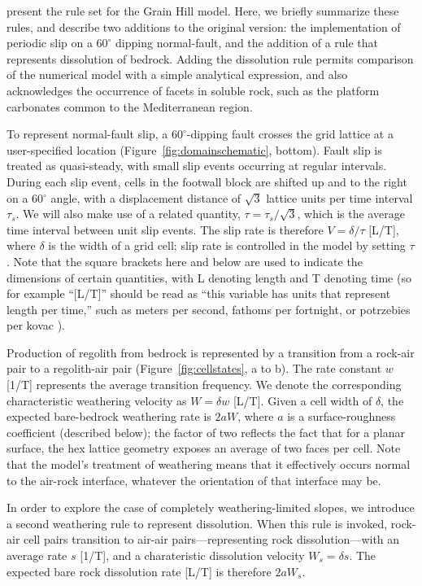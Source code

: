 \citet{tucker2018lattice} present the rule set for the Grain Hill model. Here, we briefly summarize these rules, and describe two additions to the original version: the implementation of periodic slip on a $60^\circ$ dipping normal-fault, and the addition of a rule that represents dissolution of bedrock. Adding the dissolution rule permits comparison of the numerical model with a simple analytical expression, and also acknowledges the occurrence of facets in soluble rock, such as the platform carbonates common to the Mediterranean region.

To represent normal-fault slip, a $60^\circ$-dipping fault crosses the grid lattice at a user-specified location (Figure~\ref{fig:domainschematic}, bottom). Fault slip is treated as quasi-steady, with small slip events occurring at regular intervals. During each slip event, cells in the footwall block are shifted up and to the right on a 60$^\circ$ angle, with a displacement distance of $\sqrt{3}$ lattice units per time interval $\tau_s$. We will also make use of a related quantity, $\tau= \tau_s / \sqrt{3}$, which is the average time interval between unit slip events. The slip rate is therefore $V = \delta / \tau$ [L/T], where $\delta$ is the width of a grid cell; slip rate is controlled in the model by setting $\tau$. Note that the square brackets here and below are used to indicate the dimensions of certain quantities, with L denoting length and T denoting time (so for example ``[L/T]'' should be read as ``this variable has units that represent length per time,'' such as meters per second, fathoms per fortnight, or potrzebies per kovac \citep{knuth1955potrzebie}). 

Production of regolith from bedrock is represented by a transition from a rock-air pair to a regolith-air pair (Figure~\ref{fig:cellstates}, a to b). The rate constant $w$ [1/T] represents the average transition frequency. We denote the corresponding characteristic weathering velocity as $W=\delta w$ [L/T]. Given a cell width of $\delta$, the expected bare-bedrock weathering rate is $2a W$, where $a$ is a surface-roughness coefficient (described below); the factor of two reflects the fact that for a planar surface, the hex lattice geometry exposes an average of two faces per cell. Note that the model's treatment of weathering means that it effectively occurs normal to the air-rock interface, whatever the orientation of that interface may be.

In order to explore the case of completely weathering-limited slopes, we introduce a second weathering rule to represent dissolution. When this rule is invoked, rock-air cell pairs transition to air-air pairs---representing rock dissolution---with an average rate $s$ [1/T], and a charateristic dissolution velocity $W_s = \delta s$. The expected bare rock dissolution rate [L/T] is therefore $2 a W_s$.

